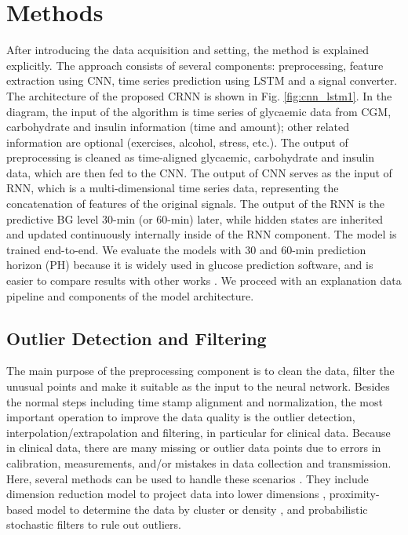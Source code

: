\documentclass[a4paper, 10 pt, twocolumn]{IEEEtran}
\begin{document}
\section{Methods}
After introducing the data acquisition and setting, the method is explained explicitly.
The approach consists of several components: preprocessing, feature extraction using CNN, time series prediction using LSTM and a signal converter. The architecture of the proposed CRNN is shown in Fig.
\ref{fig:cnn_lstm1}. In the diagram, the input of the algorithm is time series of glycaemic data from CGM, carbohydrate and insulin information (time and amount); other related information are optional (exercises,
alcohol, stress, etc.). The output of preprocessing is cleaned as time-aligned glycaemic, carbohydrate and insulin data, which are then fed to the CNN.
The output of CNN serves as the input of RNN, which is a multi-dimensional time series data, representing the concatenation of features of the original signals. The output of the RNN is the predictive BG level $30$-min
(or $60$-min) later, while hidden states are inherited and updated continuously internally inside of the RNN component. The model is trained end-to-end. We evaluate the models with $30$ and $60$-min prediction horizon
(PH) because it is widely used in glucose prediction software, and is easier to compare results with other works \cite{Sparacino-GluCon2007, Mougiakakou-NNbasedGlucose,Plis-AMachine2014, Georga-MultiPred2013,
Chunhui-PreSub2012,perez-ArtiNN2010}. We proceed with an explanation data pipeline and components of the model architecture.

\subsection{Outlier Detection and Filtering}

The main purpose of the preprocessing component is to clean the data, filter the unusual points and make it suitable as the input to the neural network. Besides the normal steps including time stamp alignment and
normalization,
the most important operation to improve the data quality is the outlier detection, interpolation/extrapolation and filtering, in particular for clinical data. Because in clinical data, there are many missing or outlier
data points due to errors in calibration, measurements, and/or mistakes in data collection and transmission. Here, several methods can be used to handle these scenarios \cite{Atanassov-AlgorithmsForOpt2009}. They include
 dimension reduction model to project data into lower dimensions \cite{Shum-PCAwihtMissing2001}, proximity-based model to determine the data by cluster or density \cite{Li-TowardsMissing2004}, and probabilistic stochastic
 filters \cite{Lekha-RealTimeNon2018}{to rule out} outliers.
\end{document}
